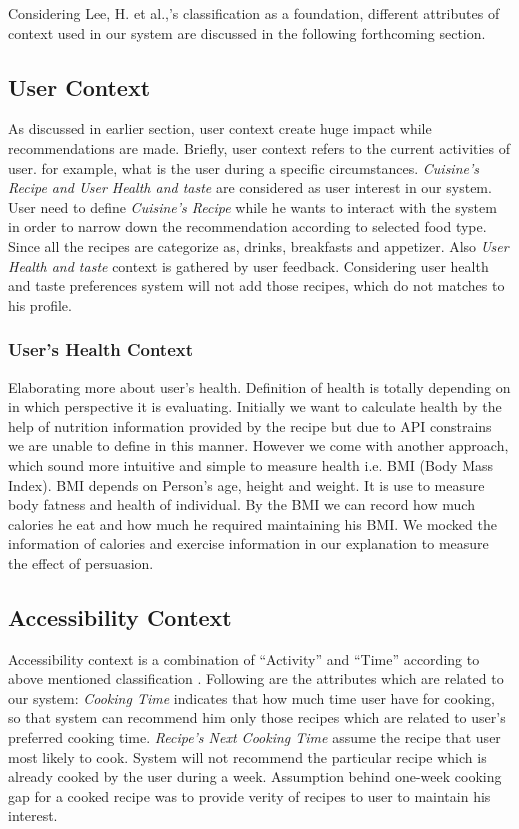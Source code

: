 Considering Lee, H. et al.,’s classification \cite{lee2005context} as a foundation, different attributes of  context used in our system are discussed in the following forthcoming section.

\subsection{User Context}

As discussed in earlier section, user context create huge impact while recommendations are made.  Briefly, user context refers to the current activities of user. for example, what is the user during a specific circumstances. \textit{Cuisine’s Recipe and User Health and taste} are considered as  user interest in our system. User need to define \textit{ Cuisine’s Recipe} while he wants to interact with the system in order to narrow down the recommendation  according to selected food type. Since all the recipes are categorize as, drinks, breakfasts and appetizer.  Also \textit{User Health and taste}  context is gathered by user feedback. Considering user health and taste preferences system will not add those recipes, which do not matches to his profile. 
	
\subsubsection{User's Health Context}

Elaborating more about user’s health. Definition of health is totally depending on in which perspective it is evaluating. Initially we want to calculate health by the help of nutrition information provided by the recipe but due to API constrains we are unable to define in this manner. However we come with another approach, which sound more intuitive and simple to measure health i.e. BMI (Body Mass Index). BMI depends on Person’s age, height and weight. It is use to measure body fatness and health of individual. By the BMI we can record how much calories he eat and how much he required maintaining his BMI. We mocked the information of calories and exercise information in our explanation to measure the effect of persuasion. 


\subsection{Accessibility Context}
	
Accessibility context is a combination of “Activity” and “Time” according to above mentioned classification \cite{lee2005context}.  Following are the attributes which are related to our system: \textit{Cooking Time} indicates that how much time user have for cooking, so that system can recommend him only those recipes which are related to user’s preferred cooking time. \textit{Recipe’s Next Cooking Time} assume the recipe that user most likely to cook. System will not recommend the particular recipe which is already cooked by the user during a week. Assumption behind one-week cooking gap for a cooked recipe was to provide verity of recipes to user to maintain his interest. 
	

